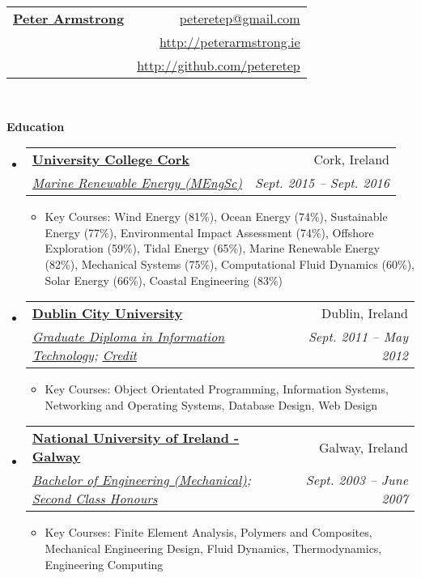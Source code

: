\documentclass[letterpaper,11pt]{article}
\makeatletter
\newcommand{\resitem}[1]{\item #1 \vspace{-2pt}}
\newcommand{\resheading}[1]{{\large \colorbox{mygrey}{\begin{minipage}{\textwidth}{\textbf{#1 \vphantom{p\^{E}}}}\end{minipage}}}}
\newcommand{\ressubheading}[4]{
\begin{tabular*}{6.5in}{l@{\extracolsep{\fill}}r}
		\textbf{#1} & #2 \\
		\textit{#3} & \textit{#4} \\
\end{tabular*}\vspace{-6pt}}
\makeatother
\begin{document}
\newcommand{\mywebheader}{
\begin{tabular*}{7in}{l@{\extracolsep{\fill}}r}
	\textbf{\href{http://www.peterarmstrong.ie/}{\LARGE Peter Armstrong}} & \href{mailto:peteretep@gmail.com}{peteretep@gmail.com}\\
	& \href{http://www.peterarmstrong.ie}{http://peterarmstrong.ie} \\
	& \href{http://github.com/peteretep}{http://github.com/peteretep}
	\end{tabular*}
\\
\vspace{0.1in}}

\mywebheader

\resheading{Education}
	\begin{itemize}
    \item
      \ressubheading{\href{http://www.ucc.ie}{University College Cork}}{Cork, Ireland}{\href{http://www.ucc.ie/en/ckr51/}{Marine Renewable Energy (MEngSc)}}
      {Sept. 2015 -- Sept. 2016}
        { \footnotesize
        \begin{itemize}
        \resitem{Key Courses: Wind Energy (81\%), Ocean Energy (74\%), Sustainable Energy (77\%), Environmental Impact Assessment (74\%), Offshore Exploration (59\%), Tidal Energy (65\%), Marine Renewable Energy (82\%), Mechanical Systems (75\%), Computational Fluid Dynamics (60\%), Solar Energy (66\%), Coastal Engineering (83\%)}
        \end{itemize}
        }

    \item
      \ressubheading{\href{http://www.dcu.ie}{Dublin City University}}{Dublin, Ireland}{\href{https://www.dcu.ie/prospective/deginfo.php?classname=GDF\&originating_school=40}{Graduate Diploma in Information Technology};
      \href{http://peterarmstrong.ie/cv/grad_dip_it_transcript.pdf}{Credit}}
      {Sept. 2011 -- May 2012}
        { \footnotesize
        \begin{itemize}
        \resitem{Key Courses: Object Orientated Programming, Information Systems, Networking and Operating Systems, Database Design, Web Design}
        \end{itemize}
        }

		\item
			\ressubheading{\href{http://www.nuigalway.ie}{National University of Ireland - Galway}}{Galway, Ireland}
			{\href{http://www.nuigalway.ie/courses/undergraduate-courses/mechanical-engineering.html}{Bachelor of Engineering (Mechanical)}; 
			\href{http://peterarmstrong.ie/cv/mech_eng_transcript.jpg}{Second Class Honours}}
      {Sept. 2003 -- June 2007}
				{ \footnotesize
				\begin{itemize}
					\resitem{Key Courses: Finite Element Analysis, Polymers and Composites, Mechanical Engineering Design, Fluid Dynamics, Thermodynamics, Engineering Computing }
				\end{itemize}
				}

	\end{itemize} %
\end{document}
